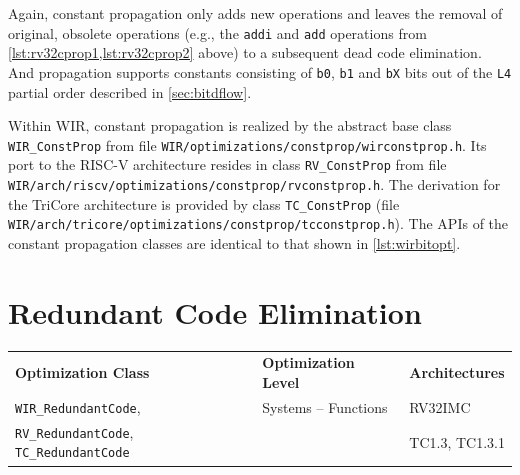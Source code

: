 Again, constant propagation only adds new operations and leaves the removal of original, obsolete operations (e.g., the \texttt{addi} and \texttt{add} operations from \cref{lst:rv32cprop1,lst:rv32cprop2} above) to a subsequent dead code elimination.
And propagation supports constants consisting of \texttt{b0}, \texttt{b1} and \texttt{bX} bits out of the \texttt{L4} partial order described in \cref{sec:bitdflow}.

Within \gls{WIR}, constant propagation is realized by the abstract base class \texttt{WIR\_ConstProp} from file \texttt{WIR/optimi\-zations/constprop/wirconstprop.h}.
Its port to the RISC-V architecture resides in class \texttt{RV\_ConstProp} from file \texttt{WIR/arch/riscv/optimizations/constprop/rvconstprop.h}.
The derivation for the TriCore architecture is provided by class \texttt{TC\_ConstProp} (file \texttt{WIR/arch/tricore/optimizations/constprop/tcconst\-prop.h}).
The \glspl{API} of the constant propagation classes are identical to that shown in \cref{lst:wirbitopt}.


\section{Redundant Code Elimination}
\label{sec:optredundantcode}

\begin{tabular}{|l|l|l|}
  \hline
  \textbf{Optimization Class} & \textbf{Optimization Level} & \textbf{Architectures} \\
  \hhline{|=|=|=|}
  \texttt{WIR\_RedundantCode}, & Systems -- Functions & RV32IMC \\
  \texttt{RV\_RedundantCode}, \texttt{TC\_RedundantCode} & & TC1.3, TC1.3.1 \\
  \hline
\end{tabular}

